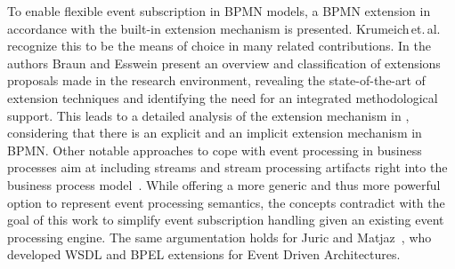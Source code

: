 To enable flexible event subscription in BPMN models, a BPMN extension in accordance with the built-in extension mechanism is presented.
Krumeich\,et.\,al.\,\cite{Krumeich2014EventDrivenBP} recognize this to be the means of choice in many related contributions.
In \cite{braun2014classification} the authors Braun and Esswein present an overview and classification of extensions proposals made in the research environment, revealing the state-of-the-art of extension techniques and identifying the need for an integrated methodological support. This leads to a detailed analysis of the extension mechanism in \cite{braun2015behind}, considering that there is an explicit and an implicit extension mechanism in BPMN.
Other notable approaches to cope with event processing in business processes aim at including streams and stream processing artifacts right into the business process model~\cite{appel2014modeling,biornstad2006control}. While offering a more generic and thus more powerful option to represent event processing semantics, the concepts contradict with the goal of this work to simplify event subscription handling given an existing event processing engine.
The same argumentation holds for Juric and Matjaz~\cite{juric2010wsdl}, who developed WSDL and BPEL extensions for Event Driven Architectures.



